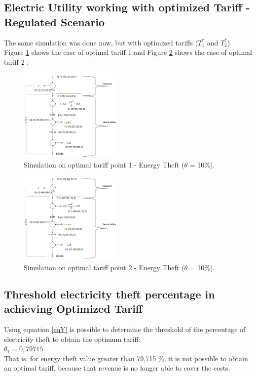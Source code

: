 \documentclass[10pt, letterpaper]{elsarticle}
\begin{document}
\subsection{Electric Utility working with optimized Tariff - Regulated Scenario}
\label{sec4-2}
The same simulation was done now, but with optimized tariffs ($T_1^* $ and $ T_2^*$). Figure \ref{Fig10} shows the case of optimal tariff 1 and Figure \ref{Fig11} shows the case of optimal tariff 2 :
\begin{figure}[h]%
\centering
\includegraphics[width = 0.45\textwidth]{Fig10.png} 
\caption{Simulation on optimal tariff point 1 - Energy Theft ($\theta$ = 10\%).}
\label{Fig10}
\end{figure}

\begin{figure}[h]%
\centering
\includegraphics[width = 0.45\textwidth]{fig11.png} 
\caption{Simulation on optimal tariff point 2 - Energy Theft ($\theta$ = 10\%).}
\label{Fig11}
\end{figure}

\subsection{Threshold electricity theft percentage in achieving Optimized Tariff}
\label{sec4-3}
Using equation \ref{eqY} is possible to determine the threshold of the percentage of electricity theft to obtain the optimum tariff: \\
$\theta_1 = 0,79715$\\
That is, for energy theft value greater than 79,715 \%, it is not possible to obtain an optimal tariff, because that revenue is no longer able to cover the costs. \\
\end{document}
